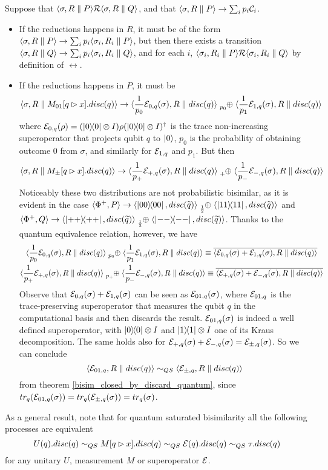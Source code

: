 Suppose that $\langle\sigma, R \parallel P\rangle \mathcal{R} \langle\sigma, R \parallel Q\rangle$, and that $\langle\sigma, R \parallel P\rangle \rightarrow \sum_i p_i \mathcal{C}_i$.\begin{itemize}
\item If the reductions happens in $R$, it must be of the form $\langle\sigma, R \parallel P\rangle \rightarrow \sum_i p_i \langle\sigma_i, R_i \parallel P\rangle$, but then there exists a transition $\langle\sigma, R \parallel Q\rangle \rightarrow \sum_i p_i \langle\sigma_i, R_i \parallel Q\rangle$, and for each $i$, $\langle\sigma_i, R_i \parallel P\rangle \mathcal{R} \langle\sigma_i, R_i \parallel Q\rangle$ by definition of $\rel$.
\item If the reductions happens in $P$, it must be 
 \[\confw{\sigma, R \parallel M_{01}[q \rhd x].disc(q)} \rightarrow \confw{\frac{1}{p_0}\sop_{0, q}(\sigma), R \parallel disc(q)} \psum{p_0} \confw{\frac{1}{p_1}\sop_{1, q}(\sigma), R \parallel disc(q)}\]
 where $\mathcal{E}_{0, q}(\rho) = (\ket{0}\!\!\bra{0}\otimes I) \rho (\ket{0}\!\!\bra{0} \otimes I)^\dagger$ is the trace non-increasing superoperator that projects qubit $q$ to $\ket{0}$, $p_0$ is the probability of obtaining outcome $0$ from $\sigma$, and similarly for $\mathcal{E}_{1, q }$ and $p_1$. But then  
 \[\confw{\sigma, R \parallel M_\pm[q \rhd x].disc(q)} \rightarrow \confw{\frac{1}{p_+}\sop_{+, q}(\sigma), R \parallel disc(q)} \psum{+} \confw{\frac{1}{p_-}\sop_{-, q}(\sigma), R \parallel disc(q)}
 \] 
 Noticeably these two distributions are not probabilistic bisimilar, as it is evident in the case $\confw{\Phi^+, P} \rightarrow \confw{\proj{00}, \discQ} \psum{\frac{1}{2}} \confw{\proj{11}, \discQ}$ and $\confw{\Phi^+, Q} \rightarrow \confw{\proj{++}, \discQ} \psum{\frac{1}{2}} \confw{\proj{--}, \discQ}$.  Thanks to the quantum equivalence relation, however, we have 
 \begin{gather*}
 \confw{\frac{1}{p_0}\sop_{0, q}(\sigma), R \parallel disc(q)} \psum{p_0} \confw{\frac{1}{p_1}\sop_{1, q}(\sigma), R \parallel disc(q)} \equiv \overline{\confw{\sop_{0, q}(\sigma) + \sop_{1, q}(\sigma), R \parallel disc(q)}}
 \\
 \confw{\frac{1}{p_+}\sop_{+, q}(\sigma), R \parallel disc(q)} \psum{p_+} \confw{\frac{1}{p_-}\sop_{-, q}(\sigma), R \parallel disc(q)} \equiv \overline{\confw{\sop_{+, q}(\sigma) + \sop_{-, q}(\sigma), R \parallel disc(q)}}
 \end{gather*}
 Observe that $\mathcal{E}_{0, q}(\sigma) + \mathcal{E}_{1, q}(\sigma)$ can be seen as $\mathcal{E}_{01, q}(\sigma)$, where $\mathcal{E}_{01, q}$ is the trace-preserving superoperator that measures the qubit $q$ in the computational basis and then discards the result. $\mathcal{E}_{01, q}(\sigma)$ is indeed a well defined superoperator, with $\ket{0}\!\!\bra{0}\otimes I$ and $\ket{1}\!\!\bra{1}\otimes I$ one of its Kraus decomposition. The same holds also for $\mathcal{E}_{+, q}(\sigma) + \mathcal{E}_{-, q}(\sigma) = \mathcal{E}_{\pm, q}(\sigma)$. So we can conclude
 \[ \langle\mathcal{E}_{01,q},  R \parallel disc(q)\rangle \sim_{QS} \langle\mathcal{E}_{\pm,q},  R \parallel disc(q)\rangle
 \]
 from theorem \ref{bisim_closed_by_discard_quantum}, since $tr_q(\mathcal{E}_{01, q}(\sigma)) = tr_q(\mathcal{E}_{\pm, q}(\sigma)) = tr_q(\sigma)$.
\end{itemize}

As a general result, note that for quantum saturated bisimilarity all the following processes are equivalent 
\[	U(q).disc(q) \sim_{QS} M[q \rhd x].disc(q) \sim_{QS} \mathcal{E}(q).disc(q) \sim_{QS} \tau.disc(q) \]
for any unitary $U$, measurement $M$ or superoperator $\mathcal{E}$.



